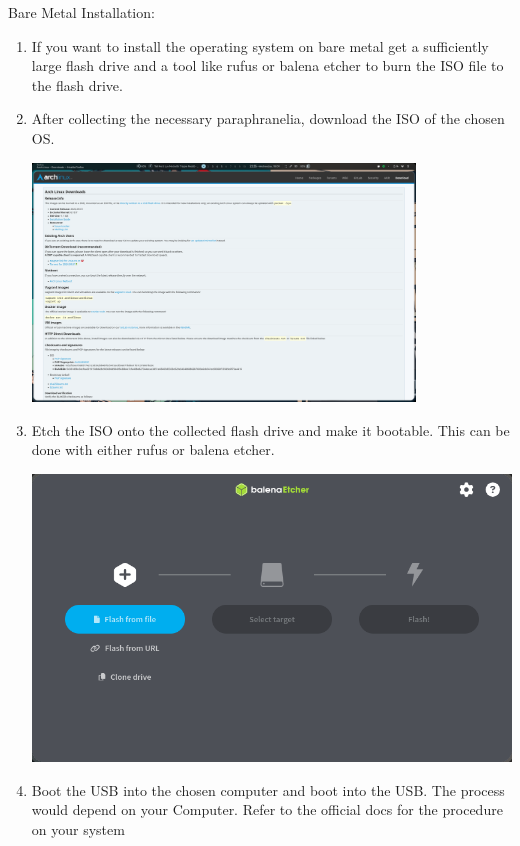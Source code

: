 \documentclass[12pt,letterpaper]{article}
\begin{document}
\pagebreak
Bare Metal Installation:
\begin{enumerate}
  \item If you want to install the operating system on bare metal get a sufficiently large flash drive and a tool like rufus or balena etcher to burn the ISO file to the flash drive. 
  \item After collecting the necessary paraphranelia, download the ISO of the chosen OS.
    \begin{center}
      \includegraphics[width=0.8\textwidth]{screens/Pasted image (4).png}
    \end{center}
  \item Etch the ISO onto the collected flash drive and make it bootable. This can be done with either rufus or balena etcher.
    \begin{center}
      \includegraphics[scale=0.45]{screens/Pasted image (5).png}
    \end{center}
  \item Boot the USB into the chosen computer and boot into the USB. The process would depend on your Computer. Refer to the official docs for the procedure on your system

\end{enumerate}
\end{document}
